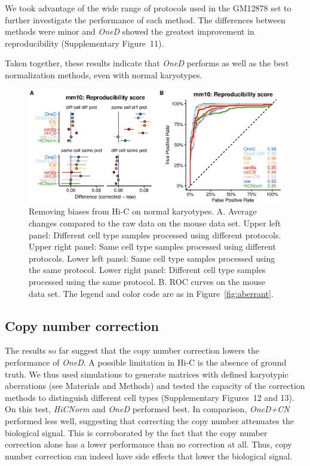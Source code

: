 \documentclass[a4,center,fleqn]{NAR}
\providecommand{\DIFadd}[1]{{\protect\color{red}#1}} %
\providecommand{\DIFdel}[1]{{\protect}}                      %
\providecommand{\DIFaddbegin}{} %
\providecommand{\DIFaddend}{} %
\providecommand{\DIFdelbegin}{} %
\providecommand{\DIFdelend}{} %
\begin{document}
We took advantage of the wide range of protocols used in the GM12878 set to
further investigate the performance of each method. The differences between
methods were minor and \textit{OneD} showed the greatest improvement in
reproducibility (Supplementary Figure~11).

Taken together, these results indicate that \textit{OneD} performs as well
as the best normalization methods, even with normal karyotypes.

\begin{figure}
\centerline{\includegraphics[width=.49\textwidth]
  {figure_3.eps}}
\caption{Removing biases from Hi-C on normal karyotypes. A. Average
  changes compared to the raw data on the mouse data set.
  Upper left panel: Different cell type samples
processed using different protocols. Upper right panel: Same cell
type samples processed using different protocols. Lower left panel:
Same cell type samples processed using the same protocol. Lower right panel:
Different cell type samples processed using the same protocol. B. ROC curves on
the mouse data set. The legend and color code are as in Figure~\ref{fig:aberrant}.}
\label{fig:normal}
\end{figure}


\subsection{Copy number correction}

The results so far suggest that the copy number correction lowers the
performance of \textit{OneD}. A possible limitation in Hi-C is the absence
of ground truth. We thus used simulations to generate matrices with
defined karyotypic aberrations (see Materials and Methods) and tested the
capacity of the correction methods to distinguish different cell types
(Supplementary \DIFdelbegin \DIFdel{Figure}\DIFdelend \DIFaddbegin \DIFadd{Figures}\DIFaddend ~12 \DIFaddbegin \DIFadd{and 13}\DIFaddend ). On this test, \textit{\DIFdelbegin \DIFdel{LGF}\DIFdelend \DIFaddbegin \DIFadd{HiCNorm}\DIFaddend } and \textit{OneD}
performed best. In comparison, \textit{OneD+CN} performed less well,
suggesting that correcting the copy number attenuates the biological
signal. This is corroborated by the fact that the copy number correction
alone has a lower performance than no correction at all. Thus, copy number
correction can indeed have side effects that lower the biological signal.
\end{document}
